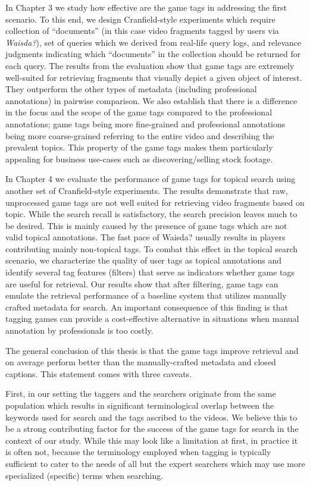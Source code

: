 In Chapter 3 we study how effective are the game tags in addressing the first scenario. To this end, we design Cranfield-style experiments which require collection of ``documents'' (in this case video
fragments tagged by users via \textit{Waisda?}), set of queries which we derived from real-life query logs, and relevance judgments indicating which ``documents'' in the collection should be returned for each
query. The results from the evaluation show that game tags are extremely well-suited for retrieving fragments that visually depict a given object of interest. They outperform the other types of metadata
(including professional annotations) in pairwise comparison. We also establish that there is a difference in the focus and the scope of the game tags compared to the professional annotations;
game tags being more fine-grained and professional annotations being more coarse-grained referring to the entire video and describing the prevalent topics. This property of the game tags makes them
particularly appealing for business use-cases such as discovering/selling stock footage.

In Chapter 4 we evaluate the performance of game tags for topical search using another set of Cranfield-style experiments. The results demonstrate that raw, unprocessed game tags are
not well suited for retrieving video fragments based on topic. While the search recall is satisfactory, the search precision leaves much to be desired. This is mainly caused by the presence of game tags
which are not valid topical annotations. The fast pace of Waisda? usually results in players contributing mainly non-topical tags. To combat this effect in the topical search scenario, we
characterize the quality of user tags as topical annotations and identify several tag features (filters) that serve as indicators whether game tags are useful for retrieval. Our results show that after filtering, game tags can emulate the retrieval performance of a baseline system that utilizes manually crafted metadata for search. An important consequence of this finding is that tagging games can provide a cost-effective
alternative in situations when manual annotation by professionals is too costly.

The general conclusion of this thesis is that the game tags improve retrieval and on average perform
better than the manually-crafted metadata and closed captions. This statement comes with
three caveats.

First, in our setting the taggers and the searchers originate from the same population which results in
significant terminological overlap between the keywords used for search and the tags ascribed to the
videos. We believe this to be a strong contributing factor for the success of the game tags for search
in the context of our study. While this may look like a limitation at first, in practice it is often not, because the terminology employed when tagging is typically sufficient to cater to the needs of all but the expert
searchers which may use more specialized (specific) terms when searching.

